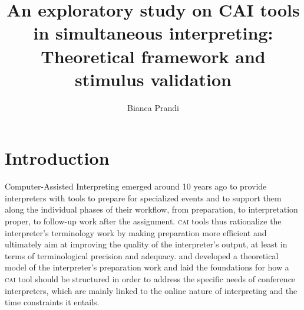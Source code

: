 \documentclass[output=paper]{langsci/langscibook}
\author{Bianca Prandi\affiliation{University of Mainz}}
\title{An exploratory study on CAI tools in simultaneous interpreting: Theoretical framework and stimulus validation}
\begin{document}

 

 

 

 

 

 

 

\section{Introduction}\label{sec:prandi:1}
Computer-Assisted Interpreting emerged around 10 years ago to provide interpreters with tools to prepare for specialized events and to support them along the individual phases of their workflow, from preparation, to interpretation proper, to follow-up work after the assignment. \textsc{cai} tools thus rationalize the interpreter’s terminology work by making preparation more efficient and ultimately aim at improving the quality of the interpreter’s output, at least in terms of terminological precision and adequacy. \citet{Rütten2007} and \citet{Will2009} developed a theoretical model of the interpreter’s preparation work and laid the foundations for how a \textsc{cai} tool should be structured in order to address the specific needs of conference interpreters, which are mainly linked to the online nature of interpreting and the time constraints it entails.
\end{document}
